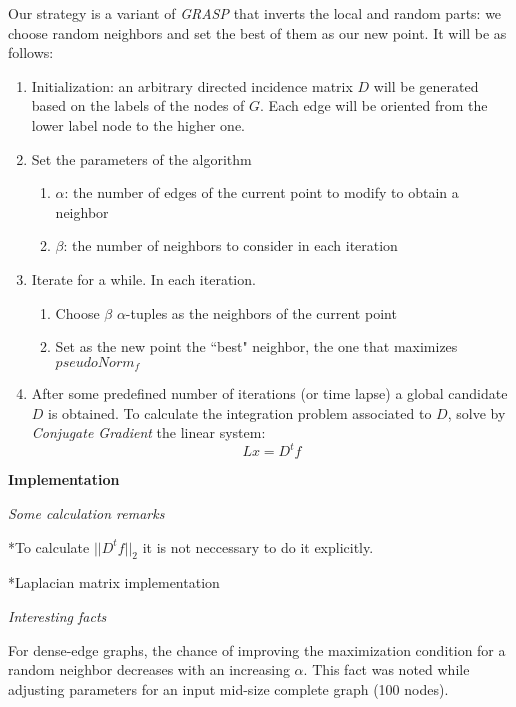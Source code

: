 \documentclass[a4paper,11pt]{article}
\begin{document}
\bigskip

Our strategy is a variant of \textit{GRASP} that inverts the local and 
random parts: we choose random neighbors and set the best of them as 
our new point. It will be as follows:

\begin{enumerate}
	\item Initialization: an arbitrary directed incidence matrix $D$ 
	will be generated based on the labels of the nodes of $G$. Each edge 
	will be oriented from the lower label node to the higher one. 
	\item Set the parameters of the algorithm
	\begin{enumerate}
		\item $\alpha$: the number of edges of the current point to 
		modify to obtain a neighbor
		\item $\beta$: the number of neighbors to consider in each 
		iteration
	\end{enumerate}
	\item Iterate for a while. In each iteration.
	\begin{enumerate}
		\item Choose $\beta$ $\alpha$-tuples as the neighbors of the
		current point
		\item Set as the new point the ``best" neighbor, the one that 
		maximizes $pseudoNorm_f$
 	\end{enumerate}
	\item After some predefined number of iterations (or time lapse) a  
	global candidate $D$ is obtained. To calculate the integration 
	problem associated to $D$, solve by \textit{Conjugate Gradient} 
	the linear system:
	$$L x = D^t f$$
\end{enumerate}

\bigskip

\textbf{Implementation}

\bigskip

\emph{Some calculation remarks}

\bigskip

*To calculate $||D^t f||_2$ it is not neccessary to do it explicitly.

*Laplacian matrix implementation

\bigskip

\emph{Interesting facts}

\bigskip

For dense-edge graphs, the chance of improving the maximization 
condition for a random neighbor decreases with an increasing $\alpha$. 
This fact was noted while adjusting parameters for an input mid-size 
complete graph (100 nodes). 
\end{document}
